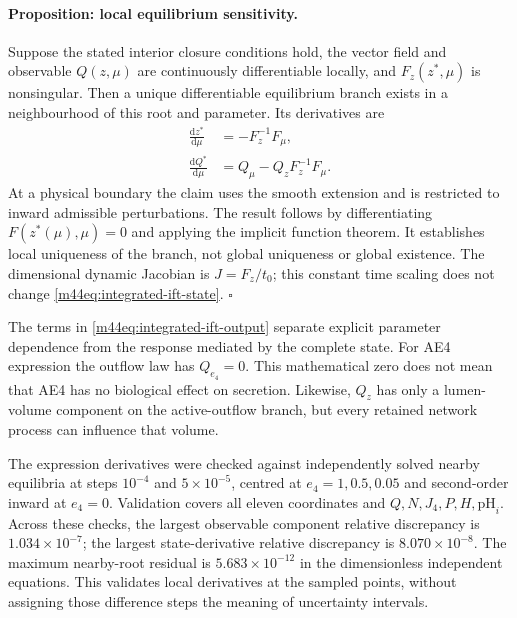 \paragraph{Proposition: local equilibrium sensitivity.}
Suppose the stated interior closure conditions hold, the vector field and
observable $Q(z,\mu)$ are continuously differentiable locally, and
$F_z(z^*,\mu)$ is nonsingular. Then a unique differentiable equilibrium
branch exists in a neighbourhood of this root and parameter. Its derivatives
are
\begin{align}
 \frac{\mathrm dz^*}{\mathrm d\mu}
   &=-F_z^{-1}F_\mu,\label{m44eq:integrated-ift-state}\\
 \frac{\mathrm dQ^*}{\mathrm d\mu}
   &=Q_\mu-Q_zF_z^{-1}F_\mu.
   \label{m44eq:integrated-ift-output}
\end{align}
At a physical boundary the claim uses the smooth extension and is restricted
to inward admissible perturbations. The result follows by differentiating
$F(z^*(\mu),\mu)=0$ and applying the implicit function theorem. It establishes
local uniqueness of the branch, not global uniqueness or global existence.
The dimensional dynamic Jacobian is $J=F_z/t_0$; this constant time scaling
does not change \eqref{m44eq:integrated-ift-state}. $\square$

The terms in \eqref{m44eq:integrated-ift-output} separate explicit parameter
dependence from the response mediated by the complete state. For AE4
expression the outflow law has $Q_{e_4}=0$. This mathematical zero does not
mean that AE4 has no biological effect on secretion. Likewise, $Q_z$ has
only a lumen-volume component on the active-outflow branch, but every
retained network process can influence that volume.

The expression derivatives were checked against independently solved nearby
equilibria at steps $10^{-4}$ and $5\times10^{-5}$, centred at
$e_4=1,0.5,0.05$ and second-order inward at $e_4=0$. Validation covers all
eleven coordinates and $Q,N,J_4,P,H,\mathrm{pH}_i$. Across these checks,
the largest observable component relative discrepancy is
$1.034\times10^{-7}$; the largest state-derivative relative discrepancy is
$8.070\times10^{-8}$. The maximum nearby-root residual is
$5.683\times10^{-12}$ in the dimensionless independent equations.
This validates local derivatives at the sampled points, without assigning
those difference steps the meaning of uncertainty intervals.

